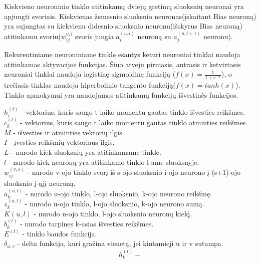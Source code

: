 Kiekvieno neuroninio tinklo atitinkamų dviejų gretimų sluoksnių neuronai yra apjungti svoriais. Kiekvienas žemesnio sluoksnio neuronas(įskaitant Bias neuroną) yra sujungtas su kiekvienu didesnio sluoksnio neuronu(išskyrus Bias neuroną) atitinkamu svoriu($w_{ij}^{u,l}$ svoris jungia $a_i^{(u,l)}$ neuroną su $a_j^{(u,l+1)}$ neuronu).

Rekurentiniame neuroniniame tinkle esantys keturi neuroniai tinklai naudoja atitinkamas aktyvacijos funkcijas. Šiuo atveju pirmasis, antrasis ir ketvirtasis neuroniai tinklai naudoja logistinę sigmoidinę funkciją ($f(x) = \frac{1}{1+e^{-x}}$), o trečiasis tinklas naudoja hiperbolinio tangento funkciją($f(x) = tanh(x)$). Tinklo apmokymui yra naudojamos atitinkamų funkcijų išvestinės funkcijos.




  $h_i^{(t)}$ - vektorius, kuris saugo t laiko momentu gautas tinklo išvesties reikšmes.\\
  $c_k^{(t)}$ - vektorius, kuris saugo t laiko momentu gautas tinklo atminties reikšmes.\\
  $M$ - išvesties ir atminties vektorių ilgis.\\
  $I$ - įvesties reikšmių vektoriaus ilgis.\\
  $L$ - nurodo kiek sluoksnių yra atitinkamame tinkle.\\
  $l$ - nurodo kiek neuronų yra atitinkamo tinklo l-ame sluoksnyje.\\
  $w_{ij}^{(v,s)}$ - nurodo v-ojo tinklo svorį iš s-ojo sluoksnio i-ojo neurono į (s+1)-ojo sluoksnio j-ąjį neuroną.\\
  $a_k^{(u,l)}$ - nurodo u-ojo tinklo, l-ojo sluoksnio, k-ojo neurono reikšmę.\\
  $z_k^{(u,l)}$ - nurodo u-ojo tinklo, l-ojo sluoksnio, k-ojo neurono sumą.\\
  $K(u,l)$ - nurodo u-ojo tinklo, l-ojo sluoksnio neuronų kiekį. \\
  $b_k^{(t)}$ - nurodo tarpines k-asias išvesties reikšmes.\\
  $E^{(t)}$ - tinklo baudos funkcija.\\
  $\delta_{u,v}$ - delta funkcija, kuri gražina vienetą, jei kintamieji u ir v sutampa. \\






\begin{equation}\label{eq:variables}
  h_k^{(t)} -
\end{equation}
